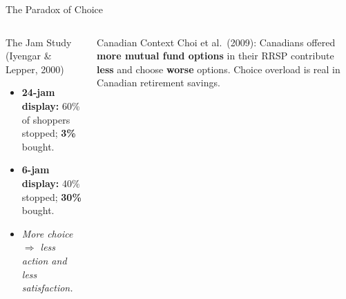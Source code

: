 \documentclass[aspectratio=169]{beamer}
\begin{document}
\begin{frame}{The Paradox of Choice}
\begin{columns}
\begin{exampleblock}{The Jam Study (Iyengar \& Lepper, 2000)}
\begin{itemize}
  \item \textbf{24-jam display:} 60\% of shoppers stopped; \textbf{3\%} bought.
  \item \textbf{6-jam display:} 40\% stopped; \textbf{30\%} bought.
  \item \textit{More choice $\Rightarrow$ less action and less satisfaction.}
\end{itemize}
\end{exampleblock}
\begin{exampleblock}{Canadian Context}
Choi et al.\ (2009): Canadians offered \textbf{more mutual fund options} in their RRSP contribute \textbf{less} and choose \textbf{worse} options. Choice overload is real in Canadian retirement savings.
\end{exampleblock}
\end{columns}
\end{frame}
\end{document}

